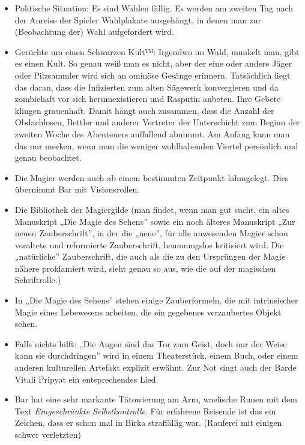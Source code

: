 \documentclass[a4paper,10pt]{scrartcl}
\begin{document}
\begin{itemize}
  \item Politische Situation: Es sind Wahlen fällig. Es werden am
    zweiten Tag nach der Anreise der Spieler Wahlplakate ausgehängt, in
    denen man zur (Beobachtung der) Wahl aufgefordert wird.
  \item Gerüchte um einen Schwarzen Kult™: Irgendwo im Wald, munkelt
    man, gibt es einen Kult. So genau weiß man es nicht, aber der eine
    oder andere Jäger oder Pilzsammler wird sich an ominöse Gesänge
    erinnern. Tatsächlich liegt das daran, dass die Infizierten zum
    alten Sägewerk konvergieren und da zombiehaft vor sich
    herumexistieren und Rasputin anbeten. Ihre Gebete klingen
    grauenhaft. Damit hängt auch zusammen, dass die Anzahl der
    Obdachlosen, Bettler und anderer Vertreter der Unterschicht zum
    Beginn der zweiten Woche des Abenteuers auffallend abnimmt. Am
    Anfang kann man das nur merken, wenn man die weniger wohlhabenden
    Viertel persönlich und genau beobachtet.
  \item Die Magier werden auch ab einem bestimmten Zeitpunkt lahmgelegt.
    Dies übernimmt Bar mit Visionsrollen.
  \item Die Bibliothek der Magiergilde (man findet, wenn man gut sucht,
      ein altes Manuskript „Die Magie des Sehens” sowie ein noch älteres
      Manuskript „Zur neuen Zauberschrift”, in der die „neue”, für alle
      anwesenden Magier schon veraltete und reformierte Zauberschrift,
      hemmungslos kritisiert wird. Die „natürliche” Zauberschrift, die
      auch als die zu den Ursprüngen der Magie nähere proklamiert wird,
      sieht genau so aus, wie die auf der magischen Schriftrolle.)
  \item In „Die Magie des Sehens” stehen einige Zauberformeln, die mit
    intrinsischer Magie eines Lebewesens arbeiten, die ein gegebenes
    verzaubertes Objekt sehen.
  \item Falls nichts hilft: „Die Augen sind das Tor zum Geist, doch nur
    der Weise kann sie durchdringen” wird in einem Theaterstück, einem
    Buch, oder einem anderen kulturellen Artefakt explizit erwähnt. Zur
    Not singt auch der Barde Vitali Pripyat ein entsprechendes Lied.
  \item Bar hat eine sehr markante Tätowierung am Arm, waelische Runen
    mit dem Text \emph{Eingeschränkte Selbstkontrolle}. Für erfahrene
    Reisende ist das ein Zeichen, dass er schon mal in Birka straffällig
    war. (Rauferei mit einigen schwer verletzten)
\end{itemize}
\end{document}
